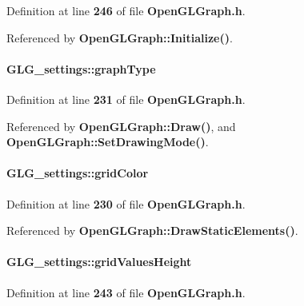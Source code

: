Definition at line {\bf 246} of file {\bf Open\+G\+L\+Graph.\+h}.



Referenced by {\bf Open\+G\+L\+Graph\+::\+Initialize()}.

\paragraph[{graph\+Type}]{ G\+L\+G\+\_\+settings\+::graph\+Type}\label{structGLG__settings_a83db4b68c9bb141aab1a90f403c787fc}


Definition at line {\bf 231} of file {\bf Open\+G\+L\+Graph.\+h}.



Referenced by {\bf Open\+G\+L\+Graph\+::\+Draw()}, and {\bf Open\+G\+L\+Graph\+::\+Set\+Drawing\+Mode()}.

\paragraph[{grid\+Color}]{ G\+L\+G\+\_\+settings\+::grid\+Color}\label{structGLG__settings_ab4ae7fefda898fbc424c4dc0fe600a5e}


Definition at line {\bf 230} of file {\bf Open\+G\+L\+Graph.\+h}.



Referenced by {\bf Open\+G\+L\+Graph\+::\+Draw\+Static\+Elements()}.

\paragraph[{grid\+Values\+Height}]{ G\+L\+G\+\_\+settings\+::grid\+Values\+Height}\label{structGLG__settings_afbaaeab61d5b2bead70caf817ee7cb7e}


Definition at line {\bf 243} of file {\bf Open\+G\+L\+Graph.\+h}.



